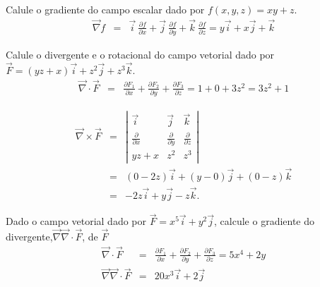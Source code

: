 \begin{ex} Calule o gradiente do campo escalar dado por $f(x,y,z)=xy+z$.
\begin{eqnarray}
 \vec{\nabla}f &=& \vec{i}~\!\frac{\partial f}{\partial x}+\vec{j}~\!\frac{\partial f}{\partial y}+\vec{k}~\!\frac{\partial f}{\partial z}
 =y\vec{i}+x\vec{j}+\vec{k}
\end{eqnarray}
\end{ex}

\begin{ex} Calule o divergente e o rotacional do campo vetorial dado por $\vec{F}=(yz+x)\vec{i}+z^2\vec{j}+z^3\vec{k}$.
\begin{eqnarray}
 \vec{\nabla}\cdot \vec{F} &=& \frac{\partial F_1}{\partial x}+\frac{\partial F_2}{\partial y}+\frac{\partial F_3}{\partial z} =
 1+0+3z^2=3z^2+1
\end{eqnarray}

\begin{eqnarray}
  \vec{\nabla}\times \vec{F}&=&\left|
 \begin{array}{ccc}
 \vec{i} & \vec{j} & \vec{k} \\
 \frac{\partial}{\partial x} &\frac{\partial}{\partial y} &\frac{\partial}{\partial z} \\
yz+x & z^2 & z^3
 \end{array}
\right|\\&=&\left(0-2z\right)\vec{i}+\left(y-0\right)\vec{j}+\left(0-z\right)\vec{k}\\
&=&-2z\vec{i}+y\vec{j}-z\vec{k}.
\end{eqnarray}
\end{ex}

\begin{ex} Dado o campo vetorial dado por $\vec{F}=x^5\vec{i}+y^2\vec{j}$, calcule o gradiente do divergente,$ \vec{\nabla} \vec{\nabla}\cdot \vec{F}$, de $\vec{F}$
\begin{eqnarray}
 \vec{\nabla}\cdot \vec{F} &=& \frac{\partial F_1}{\partial x}+\frac{\partial F_2}{\partial y}+\frac{\partial F_3}{\partial z} =
 5x^4+2y\\
 \vec{\nabla} \vec{\nabla}\cdot \vec{F}&=&20x^3\vec{i}+2\vec{j}
\end{eqnarray}
 \end{ex}


